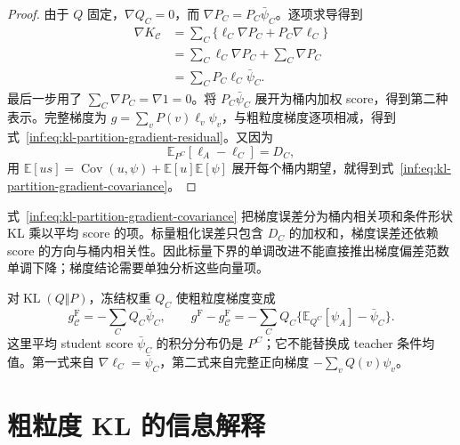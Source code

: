 \documentclass[lang=cn,scheme=chinese,openany]{../book/elegantbook}
\newcommand{\E}{\mathbb E}
\newcommand{\KL}{\operatorname{KL}}
\begin{document}
\begin{proof}
由于 $Q$ 固定，$\nabla Q_C=0$，而 $\nabla P_C=P_C\bar \psi_C$。逐项求导得到
\begin{align*}
 \nabla K_{\mathcal C}
 &=\sum_C\{\ell_C\nabla P_C+P_C\nabla\ell_C\}\\
 &=\sum_C\ell_C\nabla P_C+\sum_C\nabla P_C\\
 &=\sum_CP_C\ell_C\bar \psi_C.
\end{align*}
最后一步用了 $\sum_C\nabla P_C=\nabla1=0$。将 $P_C\bar \psi_C$ 展开为桶内加权 score，得到第二种表示。完整梯度为 $g=\sum_vP(v)\ell_v\psi_v$，与粗粒度梯度逐项相减，得到式~\eqref{inf:eq:kl-partition-gradient-residual}。又因为
\begin{equation*}
 \E_{P^C}[\ell_A-\ell_C]=D_C,
\end{equation*}
用 $\E[us]=\operatorname{Cov}(u,\psi)+\E[u]\E[\psi]$ 展开每个桶内期望，就得到式~\eqref{inf:eq:kl-partition-gradient-covariance}。
\end{proof}

式~\eqref{inf:eq:kl-partition-gradient-covariance} 把梯度误差分为桶内相关项和条件形状 KL 乘以平均 score 的项。标量粗化误差只包含 $D_C$ 的加权和，梯度误差还依赖 score 的方向与桶内相关性。因此标量下界的单调改进不能直接推出梯度偏差范数单调下降；梯度结论需要单独分析这些向量项。

对$\KL(Q\Vert P)$，冻结权重 $Q_C$ 使粗粒度梯度变成
\begin{equation*}
 g^{\mathrm F}_{\mathcal C}=-\sum_CQ_C\bar \psi_C,
 \qquad
 g^{\mathrm F}-g^{\mathrm F}_{\mathcal C}
 =-\sum_CQ_C\{\E_{Q^C}[\psi_A]-\bar \psi_C\}.
\end{equation*}
这里平均 student score $\bar \psi_C$ 的积分分布仍是 $P^C$；它不能替换成 teacher 条件均值。第一式来自 $\nabla\ell_C=\bar \psi_C$，第二式来自完整正向梯度 $-\sum_vQ(v)\psi_v$。



\section{粗粒度 KL 的信息解释}
\label{inf:identification}
\end{document}
